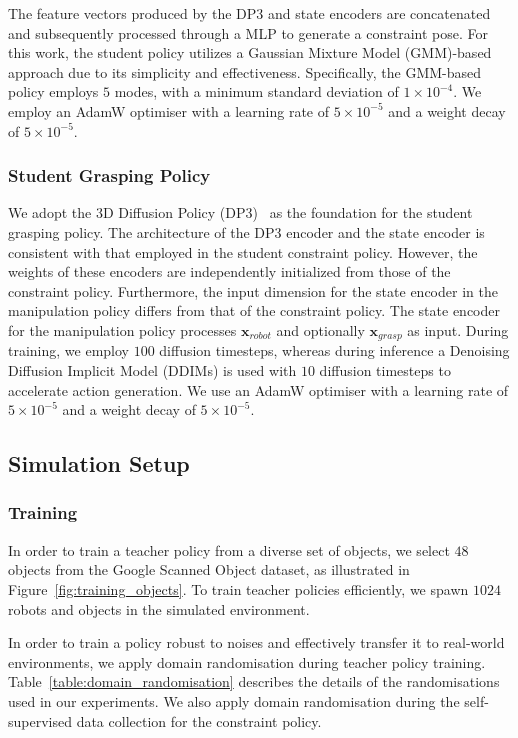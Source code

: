 The feature vectors produced by the DP3 and state encoders are concatenated and subsequently processed through a MLP to generate a constraint pose.
For this work, the student policy utilizes a Gaussian Mixture Model (GMM)-based approach due to its simplicity and effectiveness. 
Specifically, the GMM-based policy employs $5$ modes, with a minimum standard deviation of $1\times 10^{-4}$.
We employ an AdamW optimiser with a learning rate of $5 \times 10^{-5}$ and a weight decay of $5 \times 10^{-5}$.


\subsubsection{Student Grasping Policy}
We adopt the 3D Diffusion Policy (DP3)~\cite{ze20243d} as the foundation for the student grasping policy. 
The architecture of the DP3 encoder and the state encoder is consistent with that employed in the student constraint policy. 
However, the weights of these encoders are independently initialized from those of the constraint policy. 
Furthermore, the input dimension for the state encoder in the manipulation policy differs from that of the constraint policy.
The state encoder for the manipulation policy processes $\mathbf{x}_{robot}$ and optionally $\mathbf{x}_{grasp}$ as input. 
During training, we employ $100$ diffusion timesteps, whereas during inference a Denoising Diffusion Implicit Model (DDIMs) is used with  $10$ diffusion timesteps to accelerate action generation. 
We use an AdamW optimiser with a learning rate of $5 \times 10^{-5}$ and a weight decay of $5 \times 10^{-5}$.


\subsection{Simulation Setup}
\subsubsection{Training}
\label{appendix:sim_training}
In order to train a teacher policy from a diverse set of objects, we select $48$ objects from the Google Scanned Object dataset, as illustrated in Figure~\ref{fig:training_objects}.
To train teacher policies efficiently, we spawn $1024$ robots and objects in the simulated environment.

In order to train a policy robust to noises and effectively transfer it to real-world environments, we apply domain randomisation during teacher policy training.
Table~\ref{table:domain_randomisation} describes the details of the randomisations used in our experiments.
We also apply domain randomisation during the self-supervised data collection for the constraint policy.

